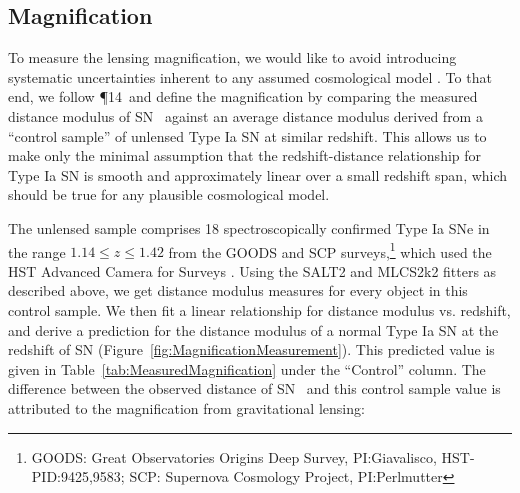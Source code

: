 
\subsection{Magnification}
\label{sec:Magnification}

To measure the lensing magnification, we would like to avoid
introducing systematic uncertainties inherent to any assumed
cosmological model \citep[e.g.][]{Nordin:2014}.  To that end, we
follow \P14\ and define the magnification by comparing
the measured distance modulus of SN \tomas\ against an average
distance modulus derived from a ``control sample'' of unlensed Type Ia
SN at similar redshift.  This allows us to make only the minimal
assumption that the redshift-distance relationship for Type Ia SN is
smooth and approximately linear over a small redshift span, which
should be true for any plausible cosmological model.

The unlensed sample comprises 18 spectroscopically confirmed Type Ia
SNe in the range $1.14\leq z \leq1.42$ from the GOODS and SCP
surveys,\footnote{GOODS: Great Observatories Origins Deep Survey,
PI:Giavalisco, HST-PID:9425,9583; SCP: Supernova Cosmology Project,
PI:Perlmutter} which used the HST Advanced Camera for
Surveys \citep{Riess:2006,Suzuki:2012}.  Using the SALT2 and MLCS2k2
fitters as described above, we get distance modulus measures for every
object in this control sample.  We then fit a linear relationship for
distance modulus vs. redshift, and derive a prediction for the
distance modulus of a normal Type Ia SN at the redshift of SN \tomas
(Figure~\ref{fig:MagnificationMeasurement}).
This predicted value is given in
Table~\ref{tab:MeasuredMagnification} under the ``Control'' column.
The difference between the observed distance of SN \tomas\ and this
control sample value is attributed to the magnification from
gravitational lensing:

